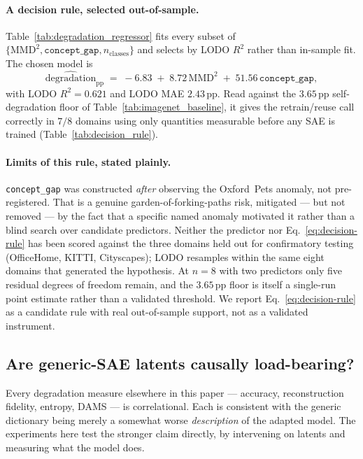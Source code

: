 \paragraph{A decision rule, selected out-of-sample.}
Table~\ref{tab:degradation_regressor} fits every subset of
$\{\mathrm{MMD}^2, \texttt{concept\_gap}, n_{\mathrm{classes}}\}$ and selects by LODO
$R^2$ rather than in-sample fit. The chosen model is
\begin{equation}
\widehat{\mathrm{degradation}}_{\mathrm{pp}}
\;=\;
-6.83 \;+\; 8.72\,\mathrm{MMD}^2 \;+\; 51.56\,\texttt{concept\_gap},
\label{eq:decision-rule}
\end{equation}
with LODO $R^2 = 0.621$ and LODO MAE $2.43$\,pp. Read against the $3.65$\,pp
self-degradation floor of Table~\ref{tab:imagenet_baseline}, it gives the retrain/reuse
call correctly in $7/8$ domains using only quantities measurable before any SAE is
trained (Table~\ref{tab:decision_rule}).

\paragraph{Limits of this rule, stated plainly.}
\texttt{concept\_gap} was constructed \emph{after} observing the Oxford~Pets anomaly, not
pre-registered. That is a genuine garden-of-forking-paths risk, mitigated --- but not
removed --- by the fact that a specific named anomaly motivated it rather than a blind
search over candidate predictors. Neither the predictor nor
Eq.~\eqref{eq:decision-rule} has been scored against the three domains held out for
confirmatory testing (OfficeHome, KITTI, Cityscapes); LODO resamples within the same
eight domains that generated the hypothesis. At $n=8$ with two predictors only five
residual degrees of freedom remain, and the $3.65$\,pp floor is itself a single-run point
estimate rather than a validated threshold. We report Eq.~\eqref{eq:decision-rule} as a
candidate rule with real out-of-sample support, not as a validated instrument.







\subsection{Are generic-SAE latents causally load-bearing?}
\label{app:causal}

Every degradation measure elsewhere in this paper --- accuracy, reconstruction fidelity,
entropy, DAMS --- is correlational. Each is consistent with the generic dictionary being
merely a somewhat worse \emph{description} of the adapted model. The experiments here
test the stronger claim directly, by intervening on latents and measuring what the model
does.

